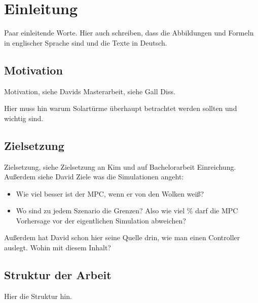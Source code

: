 \chapter{Einleitung} \label{ch_Einleitung}
Paar einleitende Worte.
Hier auch schreiben, dass die Abbildungen und Formeln in englischer Sprache sind und die Texte in Deutsch.


\section{Motivation} \label{sec_Motivation}
Motivation, siehe Davids Masterarbeit, siehe Gall Diss.

Hier muss hin warum Solartürme überhaupt betrachtet werden sollten und wichtig sind.


\section{Zielsetzung} \label{sec_Zielsetzung}
Zielsetzung, siehe Zielsetzung an Kim und auf Bachelorarbeit Einreichung.
Außerdem siehe David Ziele was die Simulationen angeht:
\begin{itemize}
    \item Wie viel besser ist der MPC, wenn er von den Wolken weiß?
    \item Wo sind zu jedem Szenario die Grenzen? Also wie viel \% darf die MPC Vorhersage vor der eigentlichen Simulation abweichen?
\end{itemize}
Außerdem hat David schon hier seine Quelle drin, wie man einen Controller auslegt.
Wohin mit diesem Inhalt?

\section{Struktur der Arbeit} \label{sec_Struktur}
Hier die Struktur hin.

